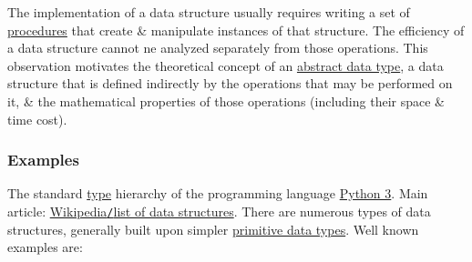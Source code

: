 \documentclass{article}
\begin{document}
The implementation of a data structure usually requires writing a set of \href{https://en.wikipedia.org/wiki/Subroutine}{procedures} that create \& manipulate instances of that structure. The efficiency of a data structure cannot ne analyzed separately from those operations. This observation motivates the theoretical concept of an \href{https://en.wikipedia.org/wiki/Abstract_data_type}{abstract data type}, a data structure that is defined indirectly by the operations that may be performed on it, \& the mathematical properties of those operations (including their space \& time cost).

\subsubsection{Examples}
{\sf The standard \href{https://en.wikipedia.org/wiki/Data_type}{type} hierarchy of the programming language \href{https://en.wikipedia.org/wiki/Python_(programming_language)}{Python 3}.} Main article: \href{https://en.wikipedia.org/wiki/List_of_data_structures}{Wikipedia{\tt/}list of data structures}. There are numerous types of data structures, generally built upon simpler \href{https://en.wikipedia.org/wiki/Primitive_data_type}{primitive data types}. Well known examples are:
\end{document}
